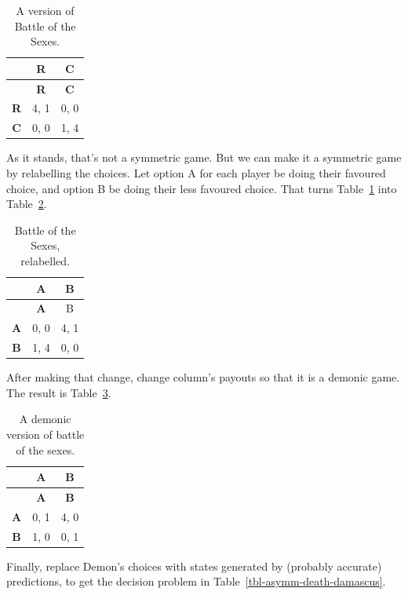 \documentclass[
  12pt,
  letterpaper,
  DIV=11,
  numbers=noendperiod]{scrreprt}
\begin{document}
\begin{longtable}[]{@{}ccc@{}}
\caption{A version of Battle of the
Sexes.}\label{tbl-bach-stravinsky}\tabularnewline
\toprule\noalign{}
& \textbf{R} & \textbf{C} \\
\midrule\noalign{}
\endfirsthead
\toprule\noalign{}
& \textbf{R} & \textbf{C} \\
\midrule\noalign{}
\endhead
\bottomrule\noalign{}
\endlastfoot
\textbf{R} & 4, 1 & 0, 0 \\
\textbf{C} & 0, 0 & 1, 4 \\
\end{longtable}

As it stands, that's not a symmetric game. But we can make it a
symmetric game by relabelling the choices. Let option A for each player
be doing their favoured choice, and option B be doing their less
favoured choice. That turns Table~\ref{tbl-bach-stravinsky} into
Table~\ref{tbl-bach-stravinsky-symmetric}.

\begin{longtable}[]{@{}ccc@{}}
\caption{Battle of the Sexes,
relabelled.}\label{tbl-bach-stravinsky-symmetric}\tabularnewline
\toprule\noalign{}
& \textbf{A} & B \\
\midrule\noalign{}
\endfirsthead
\toprule\noalign{}
& \textbf{A} & B \\
\midrule\noalign{}
\endhead
\bottomrule\noalign{}
\endlastfoot
\textbf{A} & 0, 0 & 4, 1 \\
\textbf{B} & 1, 4 & 0, 0 \\
\end{longtable}

After making that change, change column's payouts so that it is a
demonic game. The result is Table~\ref{tbl-bach-demon}.

\begin{longtable}[]{@{}ccc@{}}
\caption{A demonic version of battle of the
sexes.}\label{tbl-bach-demon}\tabularnewline
\toprule\noalign{}
& \textbf{A} & \textbf{B} \\
\midrule\noalign{}
\endfirsthead
\toprule\noalign{}
& \textbf{A} & \textbf{B} \\
\midrule\noalign{}
\endhead
\bottomrule\noalign{}
\endlastfoot
\textbf{A} & 0, 1 & 4, 0 \\
\textbf{B} & 1, 0 & 0, 1 \\
\end{longtable}

Finally, replace Demon's choices with states generated by (probably
accurate) predictions, to get the decision problem in
Table~\ref{tbl-asymm-death-damascus}.
\end{document}
